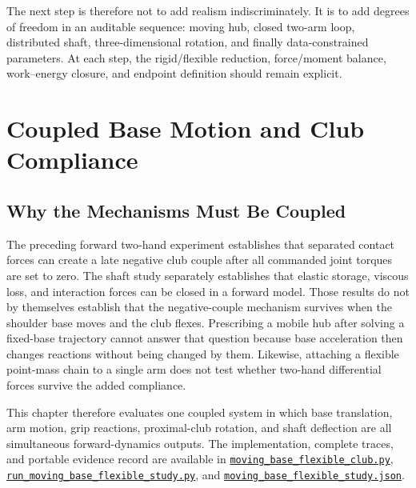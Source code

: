 \documentclass[
  letterpaper,
]{report}
\begin{document}
The next step is therefore not to add realism indiscriminately. It is to
add degrees of freedom in an auditable sequence: moving hub, closed
two-arm loop, distributed shaft, three-dimensional rotation, and finally
data-constrained parameters. At each step, the rigid/flexible reduction,
force/moment balance, work--energy closure, and endpoint definition
should remain explicit.

\chapter{Coupled Base Motion and Club
Compliance}\label{sec-coupled-base-flex}

\section{Why the Mechanisms Must Be
Coupled}\label{sec-coupled-motivation}

The preceding forward two-hand experiment establishes that separated
contact forces can create a late negative club couple after all
commanded joint torques are set to zero. The shaft study separately
establishes that elastic storage, viscous loss, and interaction forces
can be closed in a forward model. Those results do not by themselves
establish that the negative-couple mechanism survives when the shoulder
base moves and the club flexes. Prescribing a mobile hub after solving a
fixed-base trajectory cannot answer that question because base
acceleration then changes reactions without being changed by them.
Likewise, attaching a flexible point-mass chain to a single arm does not
test whether two-hand differential forces survive the added compliance.

This chapter therefore evaluates one coupled system in which base
translation, arm motion, grip reactions, proximal-club rotation, and
shaft deflection are all simultaneous forward-dynamics outputs. The
implementation, complete traces, and portable evidence record are
available in
\href{https://github.com/D-sorganization/UpstreamDrift/blob/main/scripts/research/proximal_distal_energy/moving_base_flexible_club.py}{\texttt{moving\_base\_flexible\_club.py}},
\href{https://github.com/D-sorganization/UpstreamDrift/blob/main/scripts/research/proximal_distal_energy/run_moving_base_flexible_study.py}{\texttt{run\_moving\_base\_flexible\_study.py}},
and
\href{https://github.com/D-sorganization/UpstreamDrift/blob/main/docs/research/proximal_distal_energy_transfer/data/moving_base_flexible_study.json}{\texttt{moving\_base\_flexible\_study.json}}.
\end{document}
